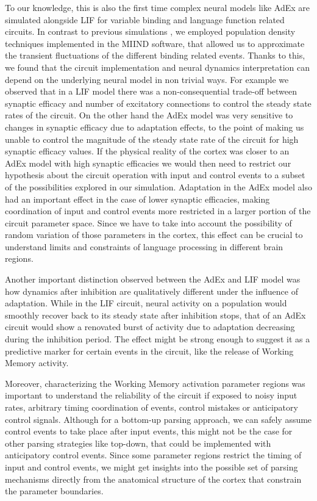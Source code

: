 \documentclass[10pt]{article}
\begin{document}
To our knowledge, this is also the first time complex neural models like AdEx are simulated alongside LIF for variable binding and language function related circuits.
In contrast to previous simulations \cite{van_der_Velde_2011, van_der_Velde_2010, Frank_2014,van_Dijk_2015}, we employed population density techniques implemented in the MIIND software\cite{de_Kamps_2008}, that allowed us to approximate the transient fluctuations of the different binding related events.
Thanks to this, we found that the circuit implementation and neural dynamics interpretation can depend on the underlying neural model in non trivial ways.
For example we observed that in a LIF model there was a non-consequential trade-off between synaptic efficacy and number of excitatory connections to control the steady state rates of the circuit.
On the other hand the AdEx model was very sensitive to changes in synaptic efficacy due to adaptation effects, to the point of making us unable to control the magnitude of the steady state rate of the circuit for high synaptic efficacy values.
If the physical reality of the cortex was closer to an AdEx model with high synaptic efficacies we would then need to restrict our hypothesis about the circuit operation with input and control events to a subset of the possibilities explored in our simulation.
Adaptation in the AdEx model also had an important effect in the case of lower synaptic efficacies, making coordination of input and control events more restricted in a larger portion of the circuit parameter space.
Since we have to take into account the possibility of random variation of those parameters in the cortex, this effect can be crucial to understand limits and constraints of language processing in different brain regions.

Another important distinction observed between the AdEx and LIF model was how dynamics after inhibition are qualitatively different under the influence of adaptation.
While in the LIF circuit, neural activity on a population would smoothly recover back to its steady state after inhibition stops, that of an AdEx circuit would show a renovated burst of activity due to adaptation decreasing during the inhibition period.
The effect might be strong enough to suggest it as a predictive marker for certain events in the circuit, like the release of Working Memory activity.

Moreover, characterizing the Working Memory activation parameter regions was important to understand the reliability of the circuit if exposed to noisy input rates, arbitrary timing coordination of events, control mistakes or anticipatory control signals.
Although for a bottom-up parsing approach, we can safely assume control events to take place after input events, this might not be the case for other parsing strategies like top-down, that could be implemented with anticipatory control events.
Since some parameter regions restrict the timing of input and control events, we might get insights into the possible set of parsing mechanisms directly from the anatomical structure of the cortex that constrain the parameter boundaries.
\end{document}

